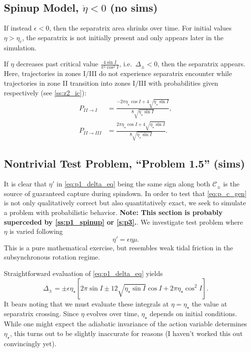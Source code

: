 \documentclass[
        fleqn,
        usenatbib,
    ]{mnras}
\newcommand*{\s}[1]{\left[#1\right]}
\begin{document}
\subsection{Spinup Model, $\dot{\eta} < 0$ (no sims)}\label{ss:p1_spinup}

If instead $\epsilon < 0$, then the separatrix area shrinks over time. For
initial values $\eta > \eta_c$, the separatrix is not initially present and only
appears later in the simulation.

If $\eta$ decreases past critical value $\frac{4\sin I}{\pi^2 \cos^2 I}$, i.e.\
$\Delta_{\pm} < 0$, then the separatrix appears. Here, trajectories in zones
I/III do not experience separatrix encounter while trajectories in zone II
transition into zones I/III with probabilities given respectively (see
\autoref{ss:z2_ic}):
\begin{equation}
    \begin{split}
        P_{II \to I} &= \frac{-2\pi \eta_\star \cos I + 4\sqrt{\eta_\star \sin I}}
            {8\sqrt{\eta_\star \sin I}}, \\
        P_{II \to III} &= \frac{2\pi \eta_\star \cos I + 4\sqrt{\eta_\star \sin
            I}} {8\sqrt{\eta_\star \sin I}}.
    \end{split}
\end{equation}

\subsection{Nontrivial Test Problem, ``Problem 1.5'' (sims)}\label{ss:p1_toy}

It is clear that $\eta'$ in \autoref{eq:p1_delta_eq} being the same sign along
both $\mathcal{C}_{\pm}$ is the source of guaranteed capture during
spindown. In order to test that \autoref{eq:p_c_gen} is not only qualitatively
correct but also quantitatively exact, we seek to simulate a problem with
probabilistic behavior. \textbf{Note: This section is probably superceded by
\autoref{ss:p1_spinup} or \autoref{s:p3}.}. We investigate test problem where
$\eta$ is varied following
\begin{equation}
    \eta' = \epsilon \eta \mu.
\end{equation}
This is a pure mathematical exercise, but resembles weak tidal friction in the
subsynchronous rotation regime.

Straightforward evaluation of \autoref{eq:p1_delta_eq} yields
\begin{equation}
    \Delta_{\pm} = \pm \epsilon \eta_\star \s{
        2\pi \sin I \pm 12 \sqrt{\eta_\star \sin I}\cos I
            + 2\pi \eta_\star \cos^2 I}.
\end{equation}
It bears noting that we must evaluate these integrals at $\eta = \eta_\star$ the
value at separatrix crossing. Since $\eta$ evolves over time, $\eta_{\star}$
depends on initial conditions. While one might expect the adiabatic invariance
of the action variable determines $\eta_\star$, this turns out to be slightly
inaccurate for reasons (I haven't worked this out convincingly yet).
\end{document}
